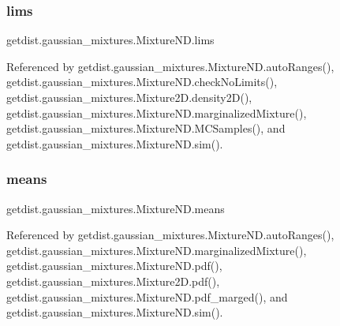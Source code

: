 \mbox{\label{classgetdist_1_1gaussian__mixtures_1_1MixtureND_a0b9e4c4e0b3529e79cfa980507f8d2ea}} 
\subsubsection{\texorpdfstring{lims}{lims}}
{\footnotesize\ttfamily getdist.\+gaussian\+\_\+mixtures.\+Mixture\+N\+D.\+lims}



Referenced by getdist.\+gaussian\+\_\+mixtures.\+Mixture\+N\+D.\+auto\+Ranges(), getdist.\+gaussian\+\_\+mixtures.\+Mixture\+N\+D.\+check\+No\+Limits(), getdist.\+gaussian\+\_\+mixtures.\+Mixture2\+D.\+density2\+D(), getdist.\+gaussian\+\_\+mixtures.\+Mixture\+N\+D.\+marginalized\+Mixture(), getdist.\+gaussian\+\_\+mixtures.\+Mixture\+N\+D.\+M\+C\+Samples(), and getdist.\+gaussian\+\_\+mixtures.\+Mixture\+N\+D.\+sim().

\mbox{\label{classgetdist_1_1gaussian__mixtures_1_1MixtureND_aeee57b3c06a515c91821b09866b52da3}} 
\subsubsection{\texorpdfstring{means}{means}}
{\footnotesize\ttfamily getdist.\+gaussian\+\_\+mixtures.\+Mixture\+N\+D.\+means}



Referenced by getdist.\+gaussian\+\_\+mixtures.\+Mixture\+N\+D.\+auto\+Ranges(), getdist.\+gaussian\+\_\+mixtures.\+Mixture\+N\+D.\+marginalized\+Mixture(), getdist.\+gaussian\+\_\+mixtures.\+Mixture\+N\+D.\+pdf(), getdist.\+gaussian\+\_\+mixtures.\+Mixture2\+D.\+pdf(), getdist.\+gaussian\+\_\+mixtures.\+Mixture\+N\+D.\+pdf\+\_\+marged(), and getdist.\+gaussian\+\_\+mixtures.\+Mixture\+N\+D.\+sim().

\mbox{\label{classgetdist_1_1gaussian__mixtures_1_1MixtureND_ad26124d47b68d38fa8e90bc135769e6b}} 
